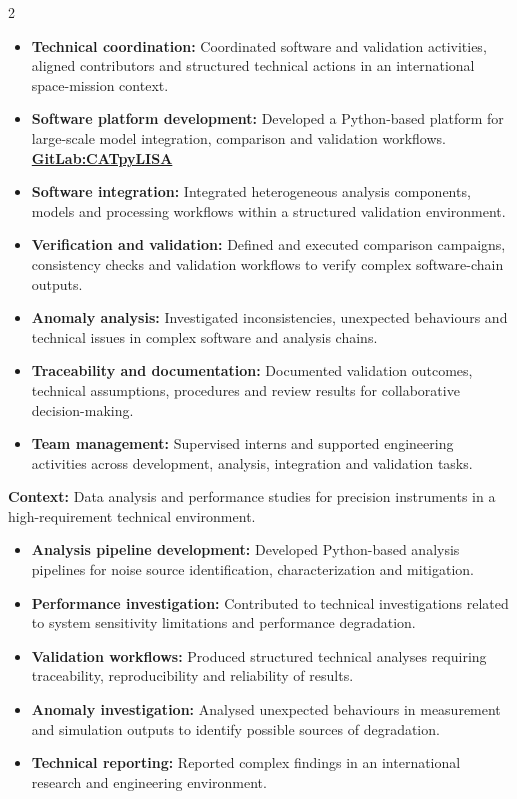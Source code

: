 \documentclass[8pt,a4paper,ragged2e,withhyper]{altacv}
\begin{document}
\begin{paracol}{2}
\begin{itemize}
\item \textbf{Technical coordination:} Coordinated software and validation activities, aligned contributors and structured technical actions in an international space-mission context.
\item \textbf{Software platform development:} Developed a Python-based platform for large-scale model integration, comparison and validation workflows. \textcolor{DarkPastelRed}{\href{https://gitlab.oca.eu/gboileau/lisa_l3_tools}{\bf GitLab:CATpyLISA}}
\item \textbf{Software integration:} Integrated heterogeneous analysis components, models and processing workflows within a structured validation environment.
\item \textbf{Verification and validation:} Defined and executed comparison campaigns, consistency checks and validation workflows to verify complex software-chain outputs.
\item \textbf{Anomaly analysis:} Investigated inconsistencies, unexpected behaviours and technical issues in complex software and analysis chains.
\item \textbf{Traceability and documentation:} Documented validation outcomes, technical assumptions, procedures and review results for collaborative decision-making.
\item \textbf{Team management:} Supervised interns and supported engineering activities across development, analysis, integration and validation tasks.
\end{itemize}

\divider


\textbf{Context:} Data analysis and performance studies for precision instruments in a high-requirement technical environment.

\begin{itemize}
\item \textbf{Analysis pipeline development:} Developed Python-based analysis pipelines for noise source identification, characterization and mitigation.
\item \textbf{Performance investigation:} Contributed to technical investigations related to system sensitivity limitations and performance degradation.
\item \textbf{Validation workflows:} Produced structured technical analyses requiring traceability, reproducibility and reliability of results.
\item \textbf{Anomaly investigation:} Analysed unexpected behaviours in measurement and simulation outputs to identify possible sources of degradation.
\item \textbf{Technical reporting:} Reported complex findings in an international research and engineering environment.
\end{itemize}


\end{paracol}
\end{document}
